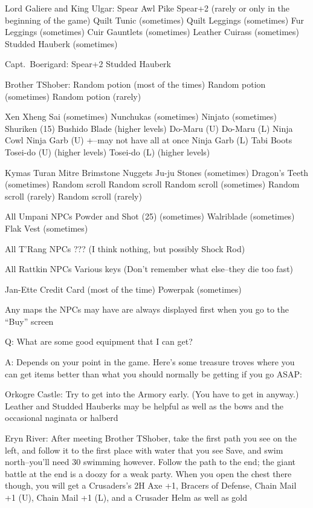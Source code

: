 \documentclass[12pt]{article}
\begin{document}
Lord Galiere and King Ulgar: Spear Awl Pike Spear+2 (rarely or only in
the beginning of the game) Quilt Tunic (sometimes) Quilt Leggings
(sometimes) Fur Leggings (sometimes) Cuir Gauntlets (sometimes) Leather
Cuirass (sometimes) Studded Hauberk (sometimes)

Capt.~Boerigard: Spear+2 Studded Hauberk

Brother TShober: Random potion (most of the times) Random potion
(sometimes) Random potion (rarely)

Xen Xheng Sai (sometimes) Nunchukas (sometimes) Ninjato (sometimes)
Shuriken (15) Bushido Blade (higher levels) Do-Maru (U) Do-Maru (L)
Ninja Cowl \textbar{} Ninja Garb (U) +--may not have all at once Ninja
Garb (L) \textbar{} Tabi Boots \textbar{} Tosei-do (U) (higher levels)
Tosei-do (L) (higher levels)

Kymas Turan Mitre Brimstone Nuggets Ju-ju Stones (sometimes) Dragon's
Teeth (sometimes) Random scroll Random scroll Random scroll (sometimes)
Random scroll (rarely) Random scroll (rarely)

All Umpani NPCs Powder and Shot (25) (sometimes) Walriblade (sometimes)
Flak Vest (sometimes)

All T'Rang NPCs ??? (I think nothing, but possibly Shock Rod)

All Rattkin NPCs Various keys (Don't remember what else--they die too
fast)

Jan-Ette Credit Card (most of the time) Powerpak (sometimes)

Any maps the NPCs may have are always displayed first when you go to the
``Buy'' screen

Q: What are some good equipment that I can get?

A: Depends on your point in the game. Here's some treasure troves where
you can get items better than what you should normally be getting if you
go ASAP:

Orkogre Castle: Try to get into the Armory early. (You have to get in
anyway.) Leather and Studded Hauberks may be helpful as well as the bows
and the occasional naginata or halberd

Eryn River: After meeting Brother TShober, take the first path you see
on the left, and follow it to the first place with water that you see
Save, and swim north--you'll need 30 swimming however. Follow the path
to the end; the giant battle at the end is a doozy for a weak party.
When you open the chest there though, you will get a Crusaders's 2H Axe
+1, Bracers of Defense, Chain Mail +1 (U), Chain Mail +1 (L), and a
Crusader Helm as well as gold
\end{document}
